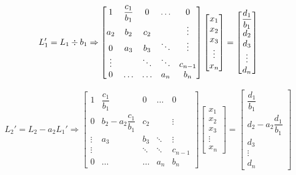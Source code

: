 \begin{equation*}
	L_1' = L_1 \divisionsymbol b_1 \Rightarrow
	\begin{bmatrix}
		1 & \dfrac{c_1}{b_1} &    0  &   \ldots   & 0\\
		a_2 & b_2 &   c_2   &        & \vdots \\
		0   & a_3 &   b_3   & \ddots & \vdots \\
	\vdots &     &  \ddots & \ddots & c_{n-1} \\
	     0  &  \ldots    &    \ldots   &  a_n   & b_n 
	\end{bmatrix}
	\begin{bmatrix}
		x_1 \\
		x_2 \\
		x_3 \\
		\vdots \\
		x_n
	\end{bmatrix}
	=\begin{bmatrix}
		\dfrac{d_1}{b_1} \\
		d_2 \\
		d_3 \\
		\vdots \\
		d_n
	\end{bmatrix}
\end{equation*}

\begin{equation*}
	L_2' = L_2 - a_2L_1'  \Rightarrow
	\begin{bmatrix}
		1 & \dfrac{c_1}{b_1} &   0    & \ldots  & 0\\
		0 & b_2 - a_2\dfrac{c_1}{b_1} &   c_2   &        & \vdots \\
   \vdots & a_3 &   b_3   & \ddots & \vdots \\
   \vdots &     &  \ddots & \ddots & c_{n-1} \\
	     0  &  \ldots   &    \ldots  &  a_n   & b_n 
	\end{bmatrix}
	\begin{bmatrix}
		x_1 \\
		x_2 \\
		x_3 \\
		\vdots \\
		x_n
	\end{bmatrix}
	=\begin{bmatrix}
		\dfrac{d_1}{b_1} \\
		d_2 - a_2\dfrac{d_1}{b_1}\\
		d_3 \\
		\vdots \\
		d_n
	\end{bmatrix}
\end{equation*}

